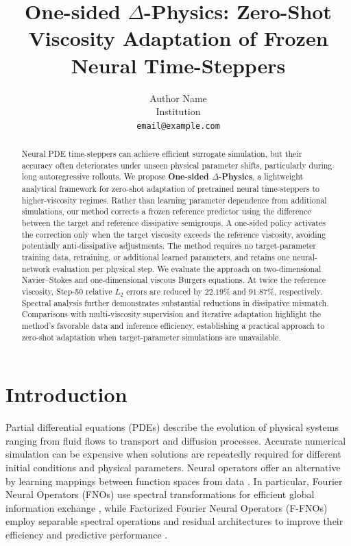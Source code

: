 \documentclass[10pt,twocolumn]{article}
\title{One-sided $\Delta$-Physics: Zero-Shot Viscosity Adaptation of Frozen Neural Time-Steppers}
\author{Author Name\\Institution\\\texttt{email@example.com}}
\date{}
\begin{document}
\maketitle



\begin{abstract}
Neural PDE time-steppers can achieve efficient surrogate
simulation, but their accuracy often deteriorates under
unseen physical parameter shifts, particularly during
long autoregressive rollouts. We propose
\textbf{One-sided $\Delta$-Physics}, a lightweight
analytical framework for zero-shot adaptation of
pretrained neural time-steppers to higher-viscosity
regimes. Rather than learning parameter dependence
from additional simulations, our method corrects
a frozen reference predictor using the difference
between the target and reference dissipative
semigroups. A one-sided policy activates the
correction only when the target viscosity exceeds
the reference viscosity, avoiding potentially
anti-dissipative adjustments. The method requires
no target-parameter training data, retraining,
or additional learned parameters, and retains
one neural-network evaluation per physical step.
We evaluate the approach on two-dimensional
Navier--Stokes and one-dimensional viscous Burgers
equations. At twice the reference viscosity,
Step-50 relative $L_2$ errors are reduced by
$22.19\%$ and $91.87\%$, respectively.
Spectral analysis further demonstrates substantial
reductions in dissipative mismatch. Comparisons
with multi-viscosity supervision and iterative
adaptation highlight the method's favorable
data and inference efficiency, establishing
a practical approach to zero-shot adaptation
when target-parameter simulations are unavailable.
\end{abstract}


\section{Introduction}
\label{sec:introduction}

Partial differential equations (PDEs) describe the evolution of physical systems ranging from fluid flows to transport and diffusion processes. Accurate numerical simulation can be expensive when solutions are repeatedly required for different initial conditions and physical parameters. Neural operators offer an alternative by learning mappings between function spaces from data \cite{lu2021deeponet,kovachki2023neuraloperator}. In particular, Fourier Neural Operators (FNOs) use spectral transformations for efficient global information exchange \cite{li2021fno}, while Factorized Fourier Neural Operators (F-FNOs) employ separable spectral operations and residual architectures to improve their efficiency and predictive performance \cite{tran2023ffno}.
\end{document}
